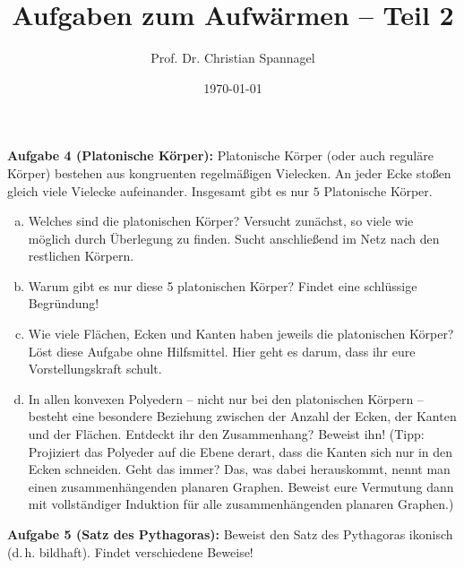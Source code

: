 \documentclass{../cssheet}
\title{Aufgaben zum Aufwärmen -- Teil 2}
\author{Prof. Dr. Christian Spannagel}
\date{\today}
\begin{document}
\printtitle

\textbf{Aufgabe 4 (Platonische Körper):}  Platonische Körper (oder auch reguläre Körper) bestehen aus kongruenten regelmäßigen Vielecken. An jeder Ecke stoßen gleich viele Vielecke aufeinander. Insgesamt gibt es nur $5$ Platonische Körper.

\begin{enumerate}[(a)]
\item Welches sind die platonischen Körper? Versucht zunächst, so viele wie möglich durch Überlegung zu finden. Sucht anschließend im Netz nach den restlichen Körpern.
\item Warum gibt es nur diese 5 platonischen Körper? Findet eine schlüssige Begründung!
\item Wie viele Flächen, Ecken und Kanten haben jeweils die platonischen Körper? Löst diese Aufgabe ohne Hilfsmittel. Hier geht es darum, dass ihr eure Vorstellungskraft schult.
\item In allen konvexen Polyedern -- nicht nur bei den platonischen Körpern -- besteht eine besondere Beziehung zwischen der Anzahl der Ecken, der Kanten und der Flächen. Entdeckt ihr den Zusammenhang? Beweist ihn! (Tipp: Projiziert das Polyeder auf die Ebene derart, dass die Kanten sich nur in den Ecken schneiden. Geht das immer? Das, was dabei herauskommt, nennt man einen zusammenhängenden planaren Graphen. Beweist eure Vermutung dann mit vollständiger Induktion für alle zusammenhängenden planaren Graphen.)
\end{enumerate}

\textbf{Aufgabe 5 (Satz des Pythagoras):} Beweist den Satz des Pythagoras ikonisch (d.\,h. bildhaft). Findet verschiedene Beweise!


\vspace*{10mm}

\printlicense

\printsocials
\end{document}
